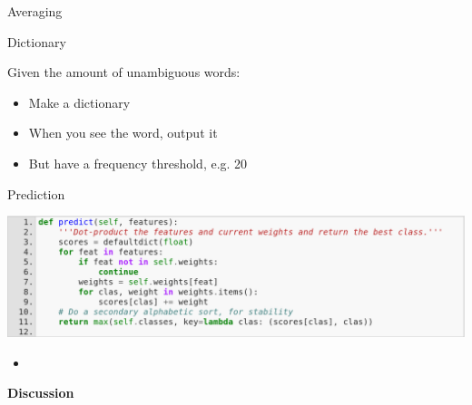 \documentclass{beamer}
\begin{document}
\begin{frame}{Averaging}

\end{frame}

\begin{frame}{Dictionary}

Given the amount of unambiguous words:
\begin{itemize}
  \item Make a dictionary
  \item When you see the word, output it
  \item But have a frequency threshold, e.g. 20
\end{itemize}

\end{frame}

\begin{frame}{Prediction}

\begin{center}
\includegraphics[width=\textwidth]{images/perceptron-predict.png}
\end{center}

\begin{itemize}
  \item 
 
\end{itemize}

\end{frame}


\begin{frame}

\centering
{\LARGE {\bf Discussion} }

\end{frame}
\end{document}
